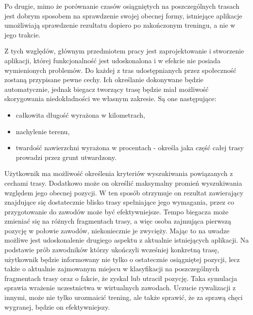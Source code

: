 Po drugie, mimo że porównanie czasów osiągniętych na poszczególnych trasach jest dobrym sposobem na sprawdzenie swojej obecnej formy, istniejące aplikacje umożliwiają sprawdzenie rezultatu dopiero po zakończonym treningu, a nie w jego trakcie.

Z tych względów, głównym przedmiotem pracy jest zaprojektowanie i stworzenie aplikacji, której funkcjonalność jest udoskonalona i w efekcie nie posiada wymienionych problemów. Do każdej z tras udostępnianych przez społeczność zostaną przypisane pewne cechy. Ich określanie dokonywane będzie automatycznie, jednak biegacz tworzący trasę będzie miał możliwość skorygowania niedokładności we własnym zakresie. Są one następujące:
\begin{itemize}
\item całkowita długość wyrażona w kilometrach,
\item nachylenie terenu,
\item twardość nawierzchni wyrażona w procentach - określa jaka część całej trasy prowadzi przez grunt utwardzony.
\end{itemize}
Użytkownik ma możliwość określenia kryteriów wyszukiwania powiązanych z cechami trasy. Dodatkowo może on określić maksymalny promień wyszukiwania względem jego obecnej pozycji. W ten sposób otrzymuje on rezultat zawierający znajdujące się dostatecznie blisko trasy spełniające jego wymagania, przez co przygotowanie do zawodów może być efektywniejsze. Tempo biegacza może zmieniać się na różnych fragmentach trasy, a więc osoba zajmująca pierwszą pozycję w połowie zawodów, niekoniecznie je zwycięży. Mając to na uwadze możliwe jest udoskonalenie drugiego aspektu z aktualnie istniejących aplikacji. Na podstawie prób zawodników którzy ukończyli wcześniej konkretną trasę, użytkownik będzie informowany nie tylko o ostatecznie osiągniętej pozycji, lecz także o aktualnie zajmowanym miejscu w klasyfikacji na poszczególnych fragmentach trasy oraz o fakcie, że zyskał lub utracił pozycję. Taka symulacja sprawia wrażenie uczestnictwa w wirtualnych zawodach. Uczucie rywalizacji z innymi, może nie tylko urozmaicić trening, ale także sprawić, że za sprawą chęci wygranej, będzie on efektywniejszy.

